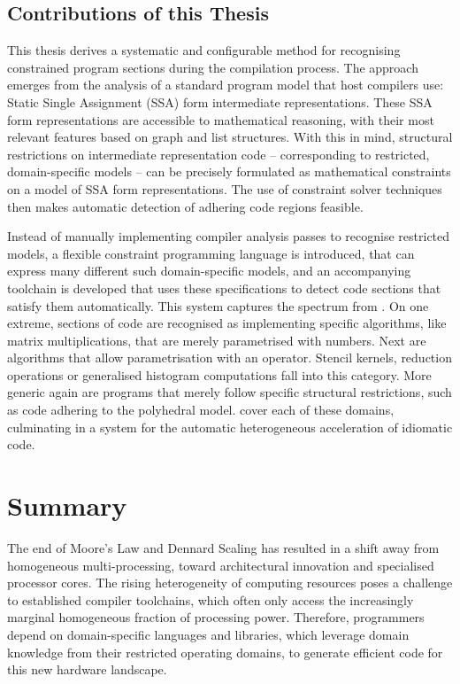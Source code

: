 \subsection{Contributions of this Thesis}

    This thesis derives a systematic and configurable method for recognising
    constrained program sections during the compilation process.
    The approach emerges from the analysis of a standard program model that host
    compilers use: Static Single Assignment (SSA) form intermediate
    representations.
    These SSA form representations are accessible to mathematical reasoning,
    with their most relevant features based on graph and list structures.
    With this in mind, structural restrictions on intermediate representation
    code -- corresponding to restricted, domain-specific models -- can be
    precisely formulated as mathematical constraints on a model of SSA form
    representations.
    The use of constraint solver techniques then makes automatic detection of
    adhering code regions feasible.

    Instead of manually implementing compiler analysis passes to recognise
    restricted models, a flexible constraint programming language is introduced,
    that can express many different such domain-specific models, and an
    accompanying toolchain is developed that uses these specifications to
    detect code sections that satisfy them automatically.
    This system captures the spectrum from .
    On one extreme, sections of code are recognised as implementing
    specific algorithms, like matrix multiplications, that are merely
    parametrised with numbers.
    Next are algorithms that allow parametrisation with an operator.
    Stencil kernels, reduction operations or generalised histogram computations
    fall into this category.
    More generic again are programs that merely follow specific structural
    restrictions, such as code adhering to the polyhedral model.
     cover each of these
    domains, culminating in a system for the automatic heterogeneous
    acceleration of idiomatic code.

\section{Summary}

    The end of Moore's Law and Dennard Scaling has resulted in a shift away from
    homogeneous multi-processing, toward architectural innovation and
    specialised processor cores.
    The rising heterogeneity of computing resources poses a challenge to
    established compiler toolchains, which often only access the increasingly
    marginal homogeneous fraction of processing power.
    Therefore, programmers depend on domain-specific languages and libraries,
    which leverage domain knowledge from their restricted operating domains, to
    generate efficient code for this new hardware landscape.

